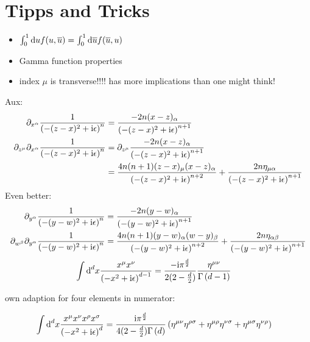 \ifdefined\mainprogram{}
\else

\fi

\section{Tipps and Tricks}
\begin{itemize}
	\item $\int _0^1 \text{d} u  f(u,\overline u) = \int _0^1 \text{d} \overline u  f(\overline u, u)$
	\item Gamma function properties
	\item index $\mu$ is transverse!!!! has more implications than one might think!
\end{itemize}


Aux:
\begin{align}
	\partial_{x^\alpha} \frac{1}{ \left(-(z-x)^2+\text{i}\epsilon\right)^{n}}
	&=
	\frac{-2n(x-z)_\alpha}{ \left(-(z-x)^2+\text{i}\epsilon\right)^{n+1}}
	\\
	\partial_{z^\mu}\partial_{x^\alpha} \frac{1}{ \left(-(z-x)^2+\text{i}\epsilon\right)^{n}}
	&=
	\partial_{z^\mu}\frac{-2n(x-z)_\alpha}{ \left(-(z-x)^2+\text{i}\epsilon\right)^{n+1}}
	\\
	&=
	\frac{4n(n+1)(z-x)_\mu(x-z)_\alpha}{ \left(-(z-x)^2+\text{i}\epsilon\right)^{n+2}} + 
	\frac{2n\eta_{\mu\alpha}}{ \left(-(z-x)^2+\text{i}\epsilon\right)^{n+1}}
\end{align}
Even better: 
\begin{align}
	\partial_{y^\alpha} \frac{1}{ \left(-(y-w)^2+\text{i}\epsilon\right)^{n}}
	&=
	\frac{-2n(y-w)_\alpha}{ \left(-(y-w)^2+\text{i}\epsilon\right)^{n+1}}
	\\
	\partial_{w^\beta}\partial_{y^\alpha} \frac{1}{ \left(-(y-w)^2+\text{i}\epsilon\right)^{n}}
	&=
	\frac{4n(n+1)(y-w)_\alpha(w-y)_\beta}{ \left(-(y-w)^2+\text{i}\epsilon\right)^{n+2}}+\frac{2n\eta_{\alpha\beta}}{ \left(-(y-w)^2+\text{i}\epsilon\right)^{n+1}}
\end{align}
\begin{align}
	\int \text{d} ^d x \frac{x^\mu x^\nu}{\left(-x^2+\text{i} \epsilon\right)^{d-1}}
	&=
	\frac{-\text{i} \pi^{\frac{d}{2}}}{2(2-\frac{d}{2})}\frac{\eta^{\mu\nu}}{\Gamma\left(d-1\right)}
\end{align}

own adaption for four elements in numerator:

\begin{align}
	\int \text{d} ^d  x \frac{x^\mu x^\nu x^\rho x^\sigma}{\left(-x^2+\text{i} \epsilon\right)^{d}}
	&=
	\frac{\text{i} \pi^{\frac{d}{2}}}{4(2-\frac{d}{2})\Gamma\left(d\right)}\left(\eta^{\mu\nu}\eta^{\rho \sigma} + \eta^{\mu \rho} \eta^{\nu \sigma} +\eta^{\mu \sigma}\eta^{\nu \rho}\right)	
\end{align}

\ifdefined\mainprogram{}
\else

\fi